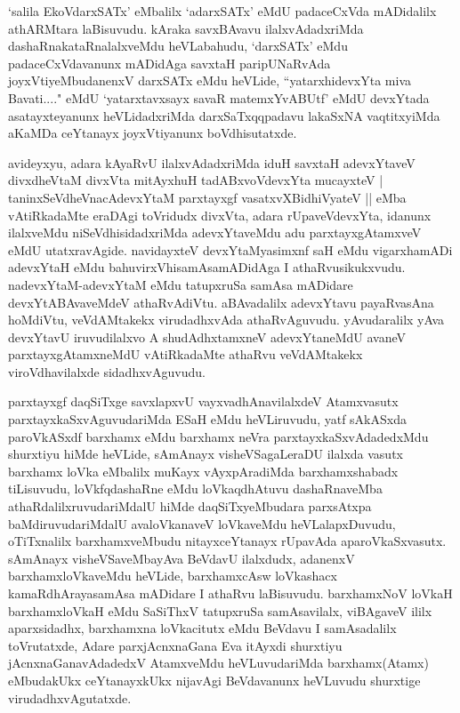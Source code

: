 \begin{artha}
`salila EkoVdarxSATx' eMbalilx `adarxSATx' eMdU padaceCxVda mADidalilx athARMtara laBisuvudu. kAraka savxBAvavu ilalxvAdadxriMda dashaRnakataRnalalxveMdu heVLabahudu, `darxSATx' eMdu padaceCxVdavanunx mADidAga savxtaH paripUNaRvAda joyxVtiyeMbudanenxV darxSATx eMdu heVLide, ``yatarxhidevxYta miva Bavati...." eMdU `yatarxtavxsayx savaR matemxYvABUtf' eMdU devxYtada asatayxteyanunx heVLidadxriMda darxSaTxqqpadavu lakaSxNA vaqtitxyiMda aKaMDa ceYtanayx joyxVtiyanunx boVdhisutatxde. 
\end{artha}

\begin{artha}
avideyxyu, adara kAyaRvU ilalxvAdadxriMda iduH savxtaH adevxYtaveV divxdheVtaM divxVta mitAyxhuH tadABxvoVdevxYta mucayxteV |
taninxSeVdheVnacAdevxYtaM parxtayxgf vasatxvXBidhiVyateV || eMba vAtiRkadaMte eraDAgi toVridudx divxVta, adara rUpaveVdevxYta, idanunx ilalxveMdu niSeVdhisidadxriMda adevxYtaveMdu adu parxtayxgAtamxveV eMdU utatxravAgide. navidayxteV devxYtaMyasimxnf saH eMdu vigarxhamADi adevxYtaH eMdu bahuvirxVhisamAsamADidAga I athaRvusikukxvudu. nadevxYtaM-adevxYtaM eMdu tatupxruSa samAsa mADidare devxYtABAvaveMdeV athaRvAdiVtu. aBAvadalilx adevxYtavu payaRvasAna hoMdiVtu, veVdAMtakekx virudadhxvAda athaRvAguvudu. yAvudaralilx yAva devxYtavU iruvudilalxvo A shudAdhxtamxneV adevxYtaneMdU avaneV parxtayxgAtamxneMdU vAtiRkadaMte athaRvu veVdAMtakekx viroVdhavilalxde sidadhxvAguvudu. 
\end{artha}%


\begin{artha}
parxtayxgf daqSiTxge savxlapxvU vayxvadhAnavilalxdeV Atamxvasutx parxtayxkaSxvAguvudariMda ESaH eMdu heVLiruvudu, yatf sAkASxda paroVkASxdf barxhamx eMdu barxhamx neVra parxtayxkaSxvAdadedxMdu shurxtiyu hiMde heVLide, sAmAnayx visheVSagaLeraDU ilalxda vasutx barxhamx loVka eMbalilx muKayx vAyxpAradiMda barxhamxshabadx tiLisuvudu, loVkfqdashaRne eMdu loVkaqdhAtuvu dashaRnaveMba athaRdalilxruvudariMdalU hiMde daqSiTxyeMbudara parxsAtxpa baMdiruvudariMdalU avaloVkanaveV loVkaveMdu heVLalapxDuvudu, oTiTxnalilx barxhamxveMbudu nitayxceYtanayx rUpavAda aparoVkaSxvasutx. sAmAnayx visheVSaveMbayAva BeVdavU ilalxdudx, adanenxV barxhamxloVkaveMdu heVLide, barxhamxcAsw loVkashacx kamaRdhArayasamAsa mADidare I athaRvu laBisuvudu. barxhamxNoV loVkaH barxhamxloVkaH eMdu SaSiThxV tatupxruSa samAsavilalx, viBAgaveV ililx aparxsidadhx, barxhamxna loVkacitutx eMdu BeVdavu I samAsadalilx toVrutatxde, Adare parxjAcnxnaGana Eva itAyxdi shurxtiyu jAcnxnaGanavAdadedxV AtamxveMdu heVLuvudariMda barxhamx(Atamx) eMbudakUkx ceYtanayxkUkx nijavAgi BeVdavanunx heVLuvudu shurxtige virudadhxvAgutatxde.
\end{artha}

